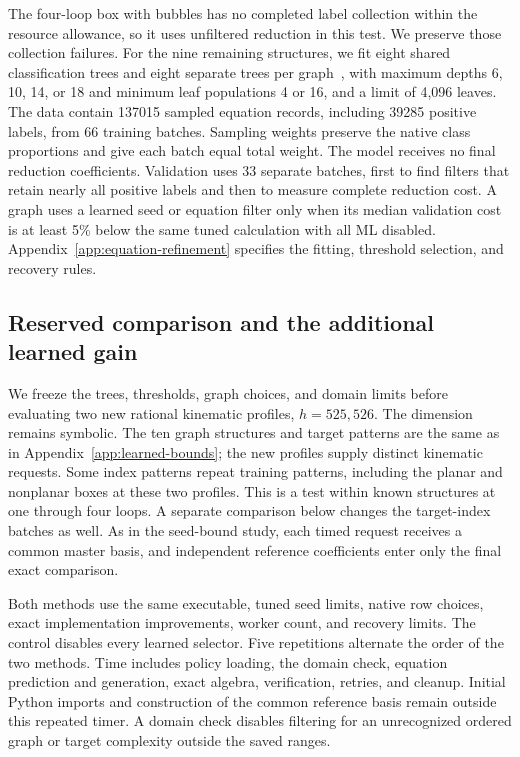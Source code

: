 The four-loop box with bubbles has no completed label collection within the resource allowance, so it uses unfiltered reduction in this test. We preserve those collection failures. For the nine remaining structures, we fit eight shared classification trees and eight separate trees per graph~\cite{CART1984,Pedregosa2011Bounds}, with maximum depths 6, 10, 14, or 18 and minimum leaf populations 4 or 16, and a limit of 4,096 leaves. The data contain 137015 sampled equation records, including 39285 positive labels, from 66 training batches. Sampling weights preserve the native class proportions and give each batch equal total weight. The model receives no final reduction coefficients. Validation uses 33 separate batches, first to find filters that retain nearly all positive labels and then to measure complete reduction cost. A graph uses a learned seed or equation filter only when its median validation cost is at least 5\% below the same tuned calculation with all ML disabled. Appendix~\ref{app:equation-refinement} specifies the fitting, threshold selection, and recovery rules.

\subsection{Reserved comparison and the additional learned gain}
We freeze the trees, thresholds, graph choices, and domain limits before evaluating two new rational kinematic profiles, $h=525,526$. The dimension remains symbolic. The ten graph structures and target patterns are the same as in Appendix~\ref{app:learned-bounds}; the new profiles supply distinct kinematic requests. Some index patterns repeat training patterns, including the planar and nonplanar boxes at these two profiles. This is a test within known structures at one through four loops. A separate comparison below changes the target-index batches as well. As in the seed-bound study, each timed request receives a common master basis, and independent reference coefficients enter only the final exact comparison.

Both methods use the same executable, tuned seed limits, native row choices, exact implementation improvements, worker count, and recovery limits. The control disables every learned selector. Five repetitions alternate the order of the two methods. Time includes policy loading, the domain check, equation prediction and generation, exact algebra, verification, retries, and cleanup. Initial Python imports and construction of the common reference basis remain outside this repeated timer. A domain check disables filtering for an unrecognized ordered graph or target complexity outside the saved ranges.

